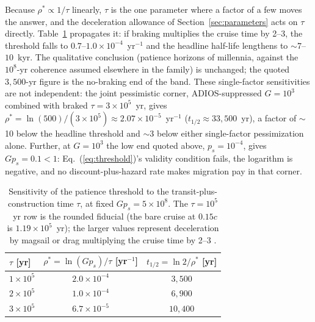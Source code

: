 \documentclass[11pt]{article}
\begin{document}
Because $\rho^{*} \propto 1/\tau$ linearly, $\tau$ is the one parameter where a factor of a few moves the answer, and the deceleration allowance of Section~\ref{sec:parameters} acts on $\tau$ directly. Table~\ref{tab:tausens} propagates it: if braking multiplies the cruise time by 2--3, the threshold falls to $0.7$--$1.0\times10^{-4}$~yr$^{-1}$ and the headline half-life lengthens to $\sim$$7$--$10$~kyr. The qualitative conclusion (patience horizons of millennia, against the $10^{8}$-yr coherence assumed elsewhere in the family) is unchanged; the quoted $3{,}500$-yr figure is the no-braking end of the band. These single-factor sensitivities are not independent: the joint pessimistic corner, ADIOS-suppressed $G = 10^{3}$ combined with braked $\tau = 3\times10^{5}$~yr, gives $\rho^{*} = \ln(500)/(3\times10^{5}) \approx 2.07\times10^{-5}$~yr$^{-1}$ ($t_{1/2} \approx 33{,}500$~yr), a factor of $\sim$10 below the headline threshold and $\sim$3 below either single-factor pessimization alone. Further, at $G = 10^{3}$ the low end quoted above, $p_{s} = 10^{-4}$, gives $G p_{s} = 0.1 < 1$: Eq.~(\ref{eq:threshold})'s validity condition fails, the logarithm is negative, and no discount-plus-hazard rate makes migration pay in that corner.

\begin{table}[tbp]
\centering
\caption{Sensitivity of the patience threshold to the transit-plus-construction time $\tau$, at fixed $G p_{s} = 5\times10^{8}$. The $\tau = 10^{5}$~yr row is the rounded fiducial (the bare cruise at $0.15c$ is $1.19\times10^{5}$~yr); the larger values represent deceleration by magsail or drag multiplying the cruise time by 2--3 \citep{ZubrinAndrews1991,PerakisHein2016,HellerHippke2017}.}
\label{tab:tausens}
\small
\begin{tabular}{lcc}
\toprule
$\tau$ [yr] & $\rho^{*} = \ln(G p_{s})/\tau$ [yr$^{-1}$] & $t_{1/2} = \ln 2/\rho^{*}$ [yr] \\
\midrule
$1\times10^{5}$ & $2.0\times10^{-4}$ & $3{,}500$ \\
$2\times10^{5}$ & $1.0\times10^{-4}$ & $6{,}900$ \\
$3\times10^{5}$ & $6.7\times10^{-5}$ & $10{,}400$ \\
\bottomrule
\end{tabular}
\end{table}
\end{document}
